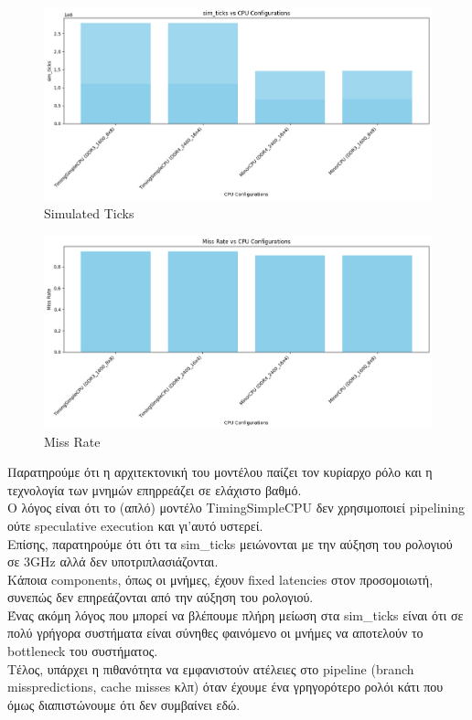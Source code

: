 \documentclass{article}
\begin{document}
\begin{figure}[H]
    \centering
    \includegraphics[width=16cm]{fib/fibonacci-charts-2.png}
    \caption{Simulated Ticks}
    \label{fig:enter-label}
\end{figure}

\begin{figure}[H]
    \centering
    \includegraphics[width=16cm]{fib/fibonacci-charts-3.png}
    \caption{Miss Rate}
    \label{fig:enter-label}
\end{figure}

Παρατηρούμε ότι η αρχιτεκτονική του μοντέλου παίζει τον κυρίαρχο ρόλο και η τεχνολογία των μνημών επηρρεάζει σε ελάχιστο βαθμό. \\
Ο λόγος είναι ότι το (απλό) μοντέλο TimingSimpleCPU δεν χρησιμοποιεί pipelining ούτε speculative execution και γι'αυτό υστερεί. \\
Επίσης, παρατηρούμε ότι ότι τα sim\_ticks μειώνονται με την αύξηση του ρολογιού σε 3GHz αλλά δεν υποτριπλασιάζονται. \\
Κάποια components, όπως οι μνήμες, έχουν fixed latencies στον προσομοιωτή, συνεπώς δεν επηρεάζονται από την αύξηση του ρολογιού. \\
Ένας ακόμη λόγος που μπορεί να βλέπουμε πλήρη μείωση στα sim\_ticks είναι ότι σε πολύ γρήγορα συστήματα είναι σύνηθες φαινόμενο οι μνήμες να αποτελούν το bottleneck του συστήματος. \\
Τέλος, υπάρχει η πιθανότητα να εμφανιστούν ατέλειες στο pipeline (branch misspredictions, cache misses κλπ) όταν έχουμε ένα γρηγορότερο ρολόι κάτι που όμως διαπιστώνουμε ότι δεν συμβαίνει εδώ. \\
\end{document}
